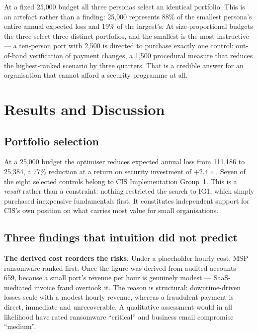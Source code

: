 \documentclass[conference]{IEEEtran}
\newcommand{\eur}{\mbox{\texteuro}}
\begin{document}
At a fixed \eur{}25{,}000 budget all three personas select an identical portfolio.
This is an artefact rather than a finding: \eur{}25{,}000 represents 88\% of the
smallest persona's entire annual expected loss and 19\% of the largest's. At
size-proportional budgets the three select three distinct portfolios, and the
smallest is the most instructive --- a ten-person port with \eur{}2{,}500 is directed
to purchase exactly one control: out-of-band verification of payment changes, a
\eur{}1{,}500 procedural measure that reduces the highest-ranked scenario by three
quarters. That is a credible answer for an organisation that cannot afford a
security programme at all.

\section{Results and Discussion}

\subsection{Portfolio selection}

At a \eur{}25{,}000 budget the optimiser reduces expected annual loss from
\eur{}111{,}186 to \eur{}25{,}384, a 77\% reduction at a return on security
investment of $+2.4\times$. Seven of the eight selected controls belong to CIS
Implementation Group~1. This is a \emph{result} rather than a constraint: nothing
restricted the search to IG1, which simply purchased inexpensive fundamentals
first. It constitutes independent support for CIS's own position on what carries
most value for small organisations.

\subsection{Three findings that intuition did not predict}

\textbf{The derived cost reorders the risks.} Under a placeholder hourly cost, MSP
ransomware ranked first. Once the figure was derived from audited accounts ---
\eur{}659, because a small port's revenue per hour is genuinely modest ---
SaaS-mediated invoice fraud overtook it. The reason is structural: downtime-driven
losses scale with a modest hourly revenue, whereas a fraudulent payment is direct,
immediate and unrecoverable. A qualitative assessment would in all likelihood have
rated ransomware ``critical'' and business email compromise ``medium''.
\end{document}
